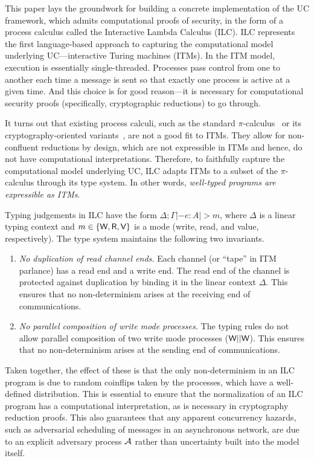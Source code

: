 This paper lays the groundwork for building a concrete implementation of the UC
framework, which admits computational proofs of security, in the form of a
process calculus called the Interactive Lambda Calculus (ILC). ILC represents
the first language-based approach to capturing the computational model
underlying UC---interactive Turing machines (ITMs). In the ITM model, execution
is essentially single-threaded. Processes pass control from one to another each
time a message is sent so that exactly one process is active at a given
time. And this choice is for good reason---it is necessary for computational
security proofs (specifically, cryptographic reductions) to go through.

It turns out that existing process calculi, such as the standard
$\pi$-calculus~\cite{milner1999communicating} or its cryptography-oriented
variants~\cite{abadi1999calculus, abadi2001mobile}, are not a good fit to
ITMs. They allow for non-confluent reductions by design, which are not
expressible in ITMs and hence, do not have computational interpretations.
Therefore, to faithfully capture the computational model underlying UC, ILC
adapts ITMs to a subset of the $\pi$-calculus through its type system. In other
words, \emph{well-typed programs are expressible as ITMs}.

Typing judgements in ILC have the form $\Delta ; \Gamma |- e : A |> m$, where $\Delta$ is a
linear typing context and $m \in \{\textsf{W}, \textsf{R}, \textsf{V}\}$ is a mode (write, read, and
value, respectively). The type system maintains the following two invariants.
\begin{enumerate}[leftmargin=*]
\item \emph{No duplication of read channel ends.} Each channel (or ``tape'' in
  ITM parlance) has a read end and a write end. The read end of the channel is
  protected against duplication by binding it in the linear context $\Delta$. This
  ensures that no non-determinism arises at the receiving end of communications.

\item \emph{No parallel composition of write mode processes.} The typing rules
  do not allow parallel composition of two write mode processes ($\textsf{W} ||
  \textsf{W}$). This ensures that no non-determinism arises at the sending end of
  communications.
\end{enumerate}

Taken together, the effect of these is that the only non-determinism in an ILC
program is due to random coinflips taken by the processes, which have a
well-defined distribution. This is essential to ensure that the normalization of
an ILC program has a computational interpretation, as is necessary in
cryptography reduction proofs. This also guarantees that any apparent
concurrency hazards, such as adversarial scheduling of messages in an
asynchronous network, are due to an explicit adversary process $\mathcal{{A}}$ rather
than uncertainty built into the model itself.

